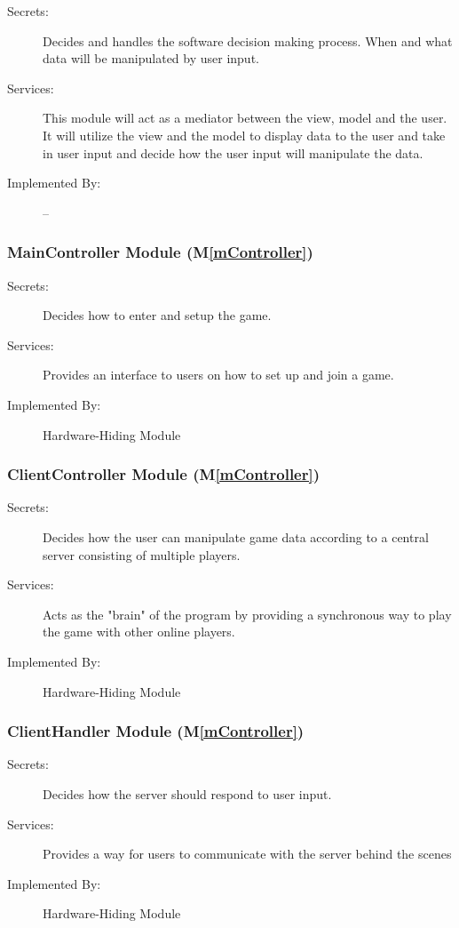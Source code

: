 \documentclass[12pt, titlepage]{article}
\newcommand{\mref}[1]{M\ref{#1}}
\begin{document}
\begin{description}
\item[Secrets:] Decides and handles the software decision making process. When and what data will be manipulated by user input.
\item[Services:] This module will act as a mediator between the view, model and the user. It will utilize the view and the model to display data to the user and take in user input and decide how the user input will manipulate the data. 
\item[Implemented By:] --
\end{description}

\subsubsection{ MainController Module (\mref{mController})}
    \begin{description}
    \item[Secrets:] Decides how to enter and setup the game.
    \item[Services:] Provides an interface to users on how to set up and join a game.
    \item[Implemented By:] Hardware-Hiding Module
    \end{description}

\subsubsection{ ClientController Module (\mref{mController})}
    \begin{description}
    \item[Secrets:] Decides how the user can manipulate game data according to a central server consisting of multiple players.
    \item[Services:] Acts as the "brain" of the program by providing a synchronous way to play the game with other online players. 
    \item[Implemented By:] Hardware-Hiding Module
    \end{description}

\subsubsection{ ClientHandler Module (\mref{mController})}
    \begin{description}
    \item[Secrets:] Decides how the server should respond to user input.
    \item[Services:] Provides a way for users to communicate with the server behind the scenes
    \item[Implemented By:] Hardware-Hiding Module
    \end{description}
\end{document}
